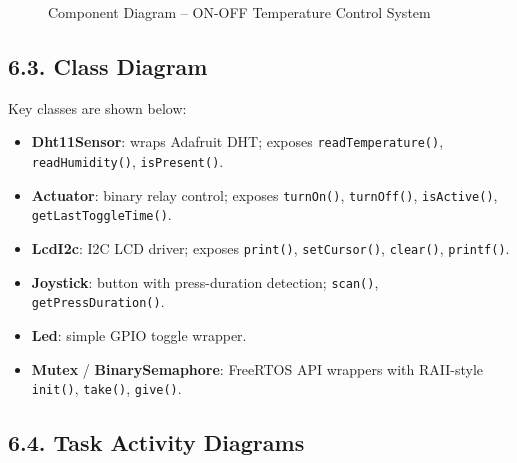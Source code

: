 \documentclass[12pt]{article}
\begin{document}
\begin{figure}[H]
{%
}
\caption{Component Diagram -- ON-OFF Temperature Control System}
\label{fig:component}
\end{figure}

\subsection*{6.3. Class Diagram}

Key classes are shown below:
\begin{itemize}
    \item \textbf{Dht11Sensor}: wraps Adafruit DHT; exposes
          \texttt{readTemperature()}, \texttt{readHumidity()},
          \texttt{isPresent()}.
    \item \textbf{Actuator}: binary relay control; exposes \texttt{turnOn()},
          \texttt{turnOff()}, \texttt{isActive()}, \texttt{getLastToggleTime()}.
    \item \textbf{LcdI2c}: I2C LCD driver; exposes \texttt{print()},
          \texttt{setCursor()}, \texttt{clear()}, \texttt{printf()}.
    \item \textbf{Joystick}: button with press-duration detection;
          \texttt{scan()}, \texttt{getPressDuration()}.
    \item \textbf{Led}: simple GPIO toggle wrapper.
    \item \textbf{Mutex} / \textbf{BinarySemaphore}: FreeRTOS API wrappers with
          RAII-style \texttt{init()}, \texttt{take()}, \texttt{give()}.
\end{itemize}

\subsection*{6.4. Task Activity Diagrams}
\end{document}
